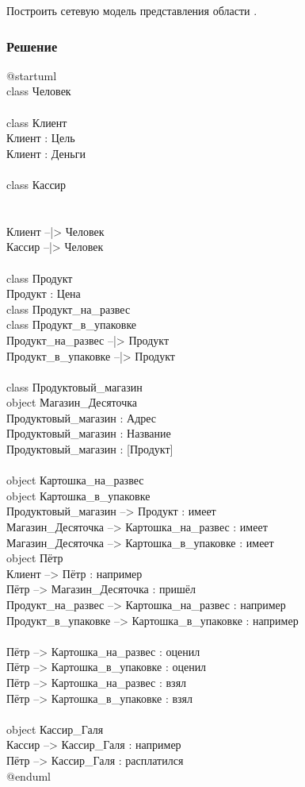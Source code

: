 \documentclass[14pt, a4paper, titlepage]{extarticle}
\begin{document}
Построить сетевую модель представления области .

\subsubsection*{Решение}

\noindent
@startuml\\
class Человек\\
\\
class Клиент\\
Клиент : Цель\\
Клиент : Деньги\\
\\
class Кассир\\
\\
\\
Клиент --|> Человек\\
Кассир --|> Человек\\
\\
class Продукт\\
Продукт : Цена\\
class Продукт\_на\_развес\\
class Продукт\_в\_упаковке\\
Продукт\_на\_развес --|> Продукт\\
Продукт\_в\_упаковке --|> Продукт\\
\\
class Продуктовый\_магазин\\
object Магазин\_Десяточка\\
Продуктовый\_магазин : Адрес\\
Продуктовый\_магазин : Название\\
Продуктовый\_магазин : [Продукт]\\
\\
object Картошка\_на\_развес\\
object Картошка\_в\_упаковке\\
Продуктовый\_магазин --> Продукт : имеет\\
Магазин\_Десяточка --> Картошка\_на\_развес : имеет\\
Магазин\_Десяточка --> Картошка\_в\_упаковке : имеет\\
object Пётр\\
Клиент -->  Пётр : например\\
Пётр --> Магазин\_Десяточка : пришёл\\
Продукт\_на\_развес --> Картошка\_на\_развес : например\\
Продукт\_в\_упаковке --> Картошка\_в\_упаковке : например\\
\\
Пётр --> Картошка\_на\_развес : оценил\\
Пётр --> Картошка\_в\_упаковке : оценил\\
Пётр --> Картошка\_на\_развес : взял\\
Пётр --> Картошка\_в\_упаковке : взял\\
\\
object Кассир\_Галя\\
Кассир --> Кассир\_Галя : например\\
Пётр --> Кассир\_Галя : расплатился\\
@enduml
\end{document}

